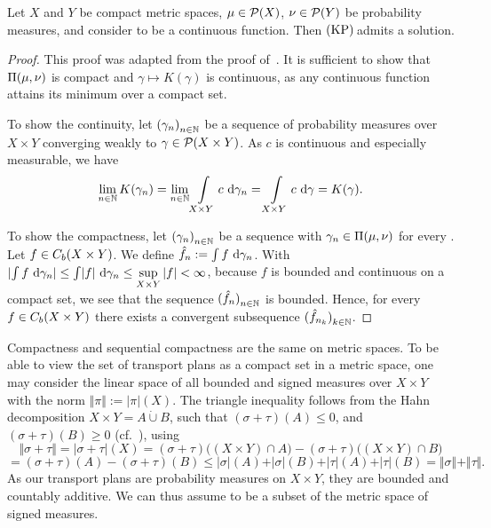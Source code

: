 \begin{lemma}\label{KPAdmitCompCont}
	Let $X$ and $Y$ be compact metric spaces, $\mu \in \PM{X}$, $\nu \in \PM{Y}$ be probability measures, and consider  to be a continuous function. Then$\text{\normalfont\ (KP)\,}$admits a solution.
\end{lemma}

\begin{proof}
	This proof was adapted from the proof of\ \cite[Theorem~1.4]{San2015}. It is sufficient to show that $\TP{\mu}{\nu}$ is compact and $\gamma \mapsto K(\gamma)$ is continuous, as any continuous function attains its minimum over a compact set.

	To show the continuity, let ${(\gamma_n)}_{\NinN}$ be a sequence of probability measures over $X \times Y$ converging weakly to $\gamma \in \PM{X \times Y}$. As $c$ is continuous and especially measurable, we have
	\[ \lim\limits_{\NinN} K(\gamma_n) = \lim\limits_{\NinN} \int\limits_{X \times Y} c~\D[\gamma_n] = \int\limits_{X \times Y} c~\D[\gamma] = K(\gamma). \] 
	
	To show the compactness, let ${(\gamma_n)}_{\NinN}$ be a sequence with $\gamma_n \in \TP{\mu}{\nu}$ for every \NinN. Let $f \in \CF[b]{X \times Y}$. We define $\hat{f}_n := \int f~\D[\gamma_n]$. With $\lvert \int f~\D[\gamma_n] \rvert \le \int \lvert f \rvert~\D[\gamma_n] \le \sup\limits_{X \times Y} |f| < \infty$, because $f$ is bounded and continuous on a compact set, we see that the sequence ${(\hat{f}_n)}_{\NinN}$ is bounded. Hence, for every $f \in \CF[b]{X \times Y}$ there exists a convergent subsequence ${(\hat{f}_{n_k})}_{\NinN[k]}$.
\end{proof}

\begin{remark}
	Compactness and sequential compactness are the same on metric spaces. To be able to view the set of transport plans as a compact set in a metric space, one may consider the linear space of all bounded and signed measures over $X \times Y$ with the norm $\Vert \pi \Vert := |\pi|(X)$. The triangle inequality follows from the Hahn decomposition $X \times Y = A \dot{\cup} B$, such that $(\sigma + \tau)(A) \le 0$, and $(\sigma + \tau)(B) \ge 0$ (cf.\ \cite[Volume~1, Theorem~3.1.1 and Corollary~3.1.2]{Bog2007}), using
	\[ \Vert \sigma + \tau \Vert = \vert \sigma + \tau \vert (X) = (\sigma + \tau)\big( (X \times Y) \cap A \big) - (\sigma + \tau)\big( (X \times Y) \cap B \big) \]
	\[ = (\sigma + \tau)(A) - (\sigma + \tau)(B) \le \vert \sigma \vert (A) + \vert \sigma \vert (B) + \vert \tau \vert (A) + \vert \tau \vert (B) = \Vert \sigma \Vert + \Vert \tau \Vert. \]
	As our transport plans are probability measures on $X \times Y$, they are bounded and countably additive. We can thus assume \TP{\mu}{\nu} to be a subset of the metric space of signed measures.
\end{remark}

